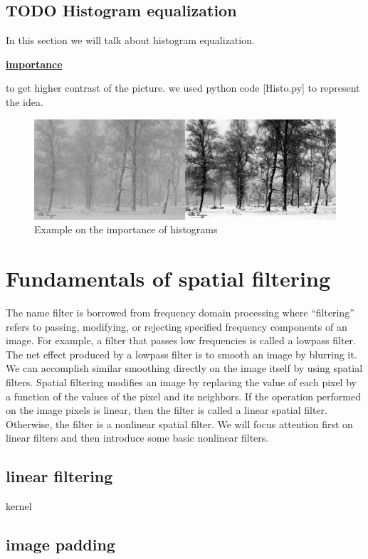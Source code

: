 \documentclass[a4paper]{article}
\begin{document}
\subsection{{\bfseries\sffamily TODO} Histogram equalization}
\label{sec:org6f143c5}
In this section we will talk about histogram equalization.

\uline{\textbf{importance}}


to get higher contrast of the picture.
we used python code [Histo.py] to represent the idea.
\begin{figure}[htbp]
\centering
\includegraphics[width=.9\linewidth]{./img/res.png}
\caption{\label{result of histogram equalization}Example on the importance of histograms}
\end{figure}
\section{Fundamentals of spatial filtering}
\label{sec:orgac4bddb}
The name filter is borrowed from frequency domain processing where “filtering” refers to passing, modifying,
or rejecting specified frequency components of an image. For example, a filter that passes low frequencies is called a lowpass filter.
The net effect produced by a lowpass filter is to smooth an image by blurring it. We can accomplish similar smoothing directly on the
image itself by using spatial filters.
Spatial filtering modifies an image by replacing the value of each pixel by a function of the values of the pixel and its neighbors. If the
operation performed on the image pixels is linear, then the filter is called a linear spatial filter. Otherwise, the filter is a nonlinear spatial
filter. We will focus attention first on linear filters and then introduce some basic nonlinear filters. 
\subsection{linear filtering}
\label{sec:orgc529dd7}
kernel
\subsection{image padding}
\label{sec:org79289b4}
\end{document}
